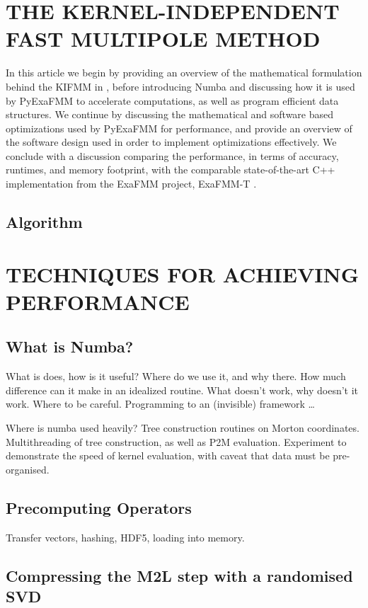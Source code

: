 \documentclass{IEEEcsmag}
\begin{document}
\section{THE KERNEL-INDEPENDENT FAST MULTIPOLE METHOD}

In this article we begin by providing an overview of the mathematical formulation behind the KIFMM in \cite{Ying2004}, before introducing Numba and discussing how it is used by PyExaFMM to accelerate computations, as well as program efficient data structures. We continue by discussing the mathematical and software based optimizations used by PyExaFMM for performance, and provide an overview of the software design used in order to implement optimizations effectively. We conclude with a discussion comparing the performance, in terms of accuracy, runtimes, and memory footprint, with the comparable state-of-the-art C++ implementation from the ExaFMM project, ExaFMM-T \cite{Wang2021}.


\subsection{Algorithm}

\section{TECHNIQUES FOR ACHIEVING PERFORMANCE}

\subsection{What is Numba?}

What is does, how is it useful? Where do we use it, and why there. How much difference can it make in an idealized routine. What doesn't work, why doesn't it work. Where to be careful. Programming to an (invisible) framework \dots

Where is numba used heavily? Tree construction routines on Morton coordinates. Multithreading of tree construction, as well as P2M evaluation. Experiment to demonstrate the speed of kernel evaluation, with caveat that data must be pre-organised.

\subsection{Precomputing Operators}

Transfer vectors, hashing, HDF5, loading into memory.

\subsection{Compressing the M2L step with a randomised SVD}
\end{document}
